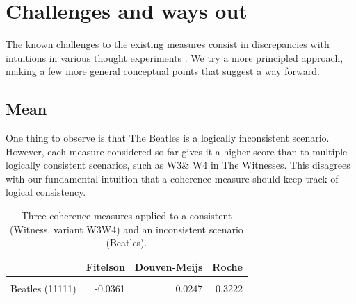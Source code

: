 \documentclass[10pt,]{scrartcl}
\begin{document}





\section{Challenges and ways out}\label{sec:challenges}


The known challenges to the existing measures  consist in discrepancies with intuitions in various thought experiments \citep{Merricks1995,shogenji1999conducive, Akiba2000Shogenjis, Shogenji2001Reply, bovens2004bayesian,Siebel2004On-Fitelsons-me,siebel2006against,Shogenji2006Why,crupi2007BayesianMeasuresEvidential, koscholke2016evaluating, Schippers2019General}. We try a more principled approach,  making a few more general conceptual points that suggest a way forward. 
















\subsection{Mean}\label{sec:mean}

One thing to observe is that \textsf{The Beatles} is a logically inconsistent scenario. However, each  measure considered so far gives it a higher score than to multiple  logically consistent scenarios, such as \textsf{W3}\& \textsf{W4} in  \textsf{The Witnesses}. This  disagrees with our fundamental
intuition that a coherence measure should keep track of logical
consistency. 



\begin{table}
\centering
\begin{tabular}{lrrr}
\toprule
  & Fitelson & Douven-Meijs & Roche\\
\midrule
\cellcolor{gray!6}{Witness W3W4 (11)} & \cellcolor{gray!6}{-0.2336} & \cellcolor{gray!6}{-0.1103} & \cellcolor{gray!6}{0.3147}\\
Beatles (11111) & -0.0361 & 0.0247 & 0.3222\\
\bottomrule
\end{tabular}
\caption{Three coherence measures applied to a consistent  (Witness, variant W3W4) and an inconsistent scenario (Beatles).}
\end{table}
\end{document}
